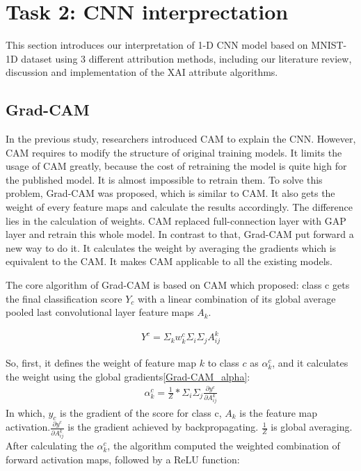 \documentclass[conference]{IEEEtran}
\begin{document}
	
	\section{Task 2: CNN interprectation}
	
	This section introduces our interpretation of 1-D CNN model based on MNIST-1D dataset using 3 different attribution methods, including our literature review, discussion and implementation of the XAI attribute algorithms.
	
	\subsection{Grad-CAM}
	In the previous study, researchers introduced CAM to explain the CNN. However, CAM requires to modify the structure of original training models. It limits the usage of CAM greatly, because the cost of retraining the model is quite high for the published model. It is almost impossible to retrain them.
	To solve this problem, Grad-CAM was proposed, which is similar to CAM. It also gets the weight of every feature maps and calculate the results accordingly. The difference lies in the calculation of weights. CAM replaced full-connection layer with GAP layer and retrain this whole model. In contrast to that, Grad-CAM put forward a new way to do it.
	It calculates the weight by averaging the gradients which is equivalent to the CAM. It makes CAM applicable to all the existing models.\par
	
	The core algorithm of Grad-CAM is based on CAM which proposed: class c gets the final classification score $Y_{c}$ with a linear combination of its global average pooled last convolutional layer feature maps $A_{k}$.
	
	\begin{equation}
		\begin{aligned}
			Y^{c}=\Sigma_{k}w_{k}^{c}\Sigma_{i}\Sigma_{j}A_{ij}^{k}
			\label{Grad-CAM_Y}
		\end{aligned}
	\end{equation}
	
	So, first, it defines the weight of feature map $k$ to class $c$ as $\alpha_{k}^{c}$, and it calculates the weight using the global gradients\ref{Grad-CAM_alpha}:
	\begin{equation}
		\begin{aligned}
			\alpha_{k}^{c}=\frac{1}{Z}*\Sigma_{i}\Sigma_{j}\frac{\partial y^{c}}{\partial A_{ij}^{k}}
			\label{Grad-CAM_alpha}
		\end{aligned}
	\end{equation}
	In which, $y_{c}$ is the gradient of the score for class c, $A_{k}$ is the feature map activation.$\frac{\partial y^{c}}{\partial A_{ij}^{k}}$ is the gradient achieved by backpropagating. $\frac{1}{Z}$ is global averaging.
	After calculating the $\alpha_{k}^{c}$, the algorithm computed the weighted combination of forward activation maps, followed by a ReLU function:
	
\end{document}

